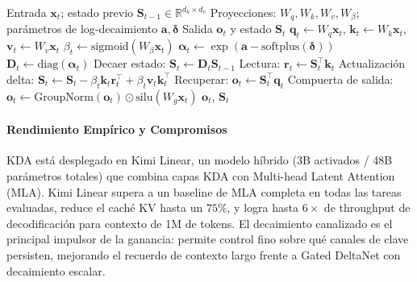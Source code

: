 \begin{algorithm}[H]
\caption{Avance Recurrente de Kimi Delta Attention (Forma de Referencia)}
\begin{algorithmic}[1]
\Require Entrada $\mathbf{x}_t$; estado previo $\mathbf{S}_{t-1} \in \mathbb{R}^{d_k \times d_v}$
\Require Proyecciones: $W_q, W_k, W_v, W_\beta$; parámetros de log-decaimiento $\mathbf{a}, \boldsymbol{\delta}$
\Ensure Salida $\mathbf{o}_t$ y estado $\mathbf{S}_t$
\State $\mathbf{q}_t \gets W_q \mathbf{x}_t$, $\mathbf{k}_t \gets W_k \mathbf{x}_t$, $\mathbf{v}_t \gets W_v \mathbf{x}_t$
\State $\beta_t \gets \mathrm{sigmoid}(W_\beta \mathbf{x}_t)$ 
\State $\boldsymbol{\alpha}_t \gets \exp(\mathbf{a} - \mathrm{softplus}(\boldsymbol{\delta}))$ 
\State $\mathbf{D}_t \gets \mathrm{diag}(\boldsymbol{\alpha}_t)$ 
\State Decaer estado: $\mathbf{S}_t \gets \mathbf{D}_t \mathbf{S}_{t-1}$
\State Lectura: $\mathbf{r}_t \gets \mathbf{S}_t^\top \mathbf{k}_t$ 
\State Actualización delta: $\mathbf{S}_t \gets \mathbf{S}_t - \beta_t \mathbf{k}_t \mathbf{r}_t^\top + \beta_t \mathbf{v}_t \mathbf{k}_t^\top$
\State Recuperar: $\mathbf{o}_t \gets \mathbf{S}_t^\top \mathbf{q}_t$
\State Compuerta de salida: $\mathbf{o}_t \gets \mathrm{GroupNorm}(\mathbf{o}_t) \odot \mathrm{silu}(W_g \mathbf{x}_t)$
\State \Return $\mathbf{o}_t$, $\mathbf{S}_t$
\end{algorithmic}
\end{algorithm}

\paragraph{Rendimiento Empírico y Compromisos}

KDA está desplegado en Kimi Linear, un modelo híbrido (3B activados / 48B parámetros totales) que combina capas KDA con Multi-head Latent Attention (MLA). Kimi Linear supera a un baseline de MLA completa en todas las tareas evaluadas, reduce el caché KV hasta un $75\%$, y logra hasta $6\times$ de throughput de decodificación para contexto de 1M de tokens. El decaimiento canalizado es el principal impulsor de la ganancia: permite control fino sobre qué canales de clave persisten, mejorando el recuerdo de contexto largo frente a Gated DeltaNet con decaimiento escalar.

